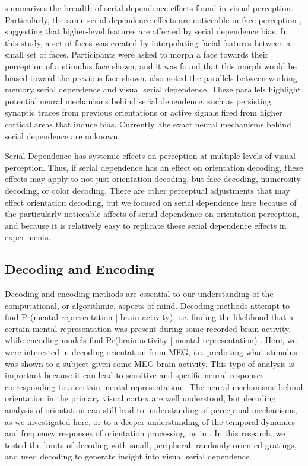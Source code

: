 \documentclass[../main.tex]{subfiles}
\begin{document}
\cite{KIYONAGA2017493} summarizes the breadth of serial dependence effects found in visual perception. Particularly, the same serial dependence effects are noticeable in face perception \citep{liberman_2014}, suggesting that higher-level features are affected by serial dependence bias. In this study, a set of faces was created by interpolating facial features between a small set of faces. Participants were asked to morph a face towards their perception of a stimulus face shown, and it was found that this morph would be biased toward the previous face shown. \cite{KIYONAGA2017493} also noted the parallels between working memory serial dependence and visual serial dependence. These parallels highlight potential neural mechanisms behind serial dependence, such as persisting synaptic traces from previous orientations or active signals fired from higher cortical areas that induce bias. Currently, the exact neural mechanisms behind serial dependence are unknown.

Serial Dependence has systemic effects on perception at multiple levels of visual perception. Thus, if serial dependence has an effect on orientation decoding, these effects may apply to not just orientation decoding, but face decoding, numerosity decoding, or color decoding. There are other perceptual adjustments that may effect orientation decoding, but we focused on serial dependence here because of the particularly noticeable affects of serial dependence on orientation perception, and because it is relatively easy to replicate these serial dependence effects in experiments.

\subsection{Decoding and Encoding}
Decoding and encoding methods are essential to our understanding of the computational, or algorithmic, aspects of mind. Decoding methods attempt to find Pr(mental representation | brain activity), i.e. finding the likelihood that a certain mental representation was present during some recorded brain activity, while encoding models find Pr(brain activity | mental representation) \citep{king_2018}. Here, we were interested in decoding orientation from MEG, i.e. predicting what stimulus was shown to a subject given some MEG brain activity. This type of analysis is important because it can lead to sensitive and specific neural responses corresponding to a certain mental representation \citep{king_2018}. The neural mechanisms behind orientation in the primary visual cortex \citep{hubel_wiesel_1959} are well understood, but decoding analysis of orientation can still lead to understanding of perceptual mechanisms, as we investigated here, or to a deeper understanding of the temporal dynamics and frequency responses of orientation processing, as in \cite{GARCIA2013515}. In this research, we tested the limits of decoding with small, peripheral, randomly oriented gratings, and used decoding to generate insight into visual serial dependence.
\end{document}
